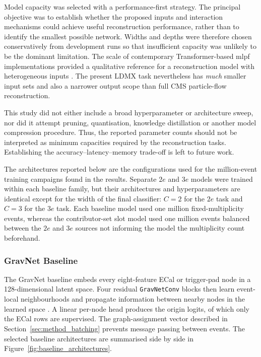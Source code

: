 Model capacity was selected with a performance-first strategy. The principal
objective was to establish whether the proposed inputs and interaction
mechanisms could achieve useful reconstruction performance, rather than to
identify the smallest possible network. Widths and depths were therefore
chosen conservatively from development runs so that insufficient capacity was
unlikely to be the dominant limitation. The scale of contemporary
Transformer-based \gls{mlpf} implementations provided a qualitative reference
for a reconstruction model with heterogeneous inputs
\cite{pata2026-mlpf}. The present LDMX task nevertheless has \emph{much} smaller input
sets and also a narrower output scope than full CMS particle-flow reconstruction.

This study did not either include a broad hyperparameter or architecture sweep, nor
did it attempt pruning, quantisation, knowledge distillation or another model
compression procedure. Thus, the reported parameter counts should not be interpreted as
minimum capacities required by the reconstruction tasks. Establishing the
accuracy--latency--memory trade-off is left to future work.

The architectures reported below are the configurations used for the
million-event training campaigns found in the results. Separate \(2e\) and \(3e\) models were
trained within each baseline family, but their architectures and
hyperparameters are identical except for the width of the final classifier:
\(C=2\) for the \(2e\) task and \(C=3\) for the \(3e\) task. Each baseline model used one million
fixed-multiplicity events, whereas the contributor-set slot model used one
million events balanced between the \(2e\) and \(3e\) sources not informing the model the multiplicity count beforehand.



\subsubsection{GravNet Baseline}

The GravNet baseline embeds every eight-feature ECal or trigger-pad node in a
128-dimensional latent space. Four residual \texttt{GravNetConv} blocks then
learn event-local neighbourhoods and propagate information between nearby
nodes in the learned space \cite{qasim2019-gravnet}. A linear per-node head
produces the origin logits, of which only the ECal rows are supervised. The
graph-assignment vector described in
Section~\ref{sec:method_batching} prevents message passing between events. The selected baseline architectures are summarised side by side in
Figure~\ref{fig:baseline_architectures}.

